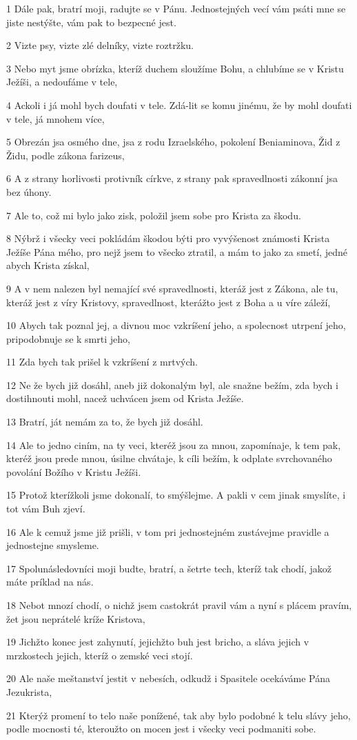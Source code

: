 \par 1 Dále pak, bratrí moji, radujte se v Pánu. Jednostejných vecí vám psáti mne se jiste nestýšte, vám pak to bezpecné jest.
\par 2 Vizte psy, vizte zlé delníky, vizte roztržku.
\par 3 Nebo myt jsme obrízka, kteríž duchem sloužíme Bohu, a chlubíme se v Kristu Ježíši, a nedoufáme v tele,
\par 4 Ackoli i já mohl bych doufati v tele. Zdá-lit se komu jinému, že by mohl doufati v tele, já mnohem více,
\par 5 Obrezán jsa osmého dne, jsa z rodu Izraelského, pokolení Beniaminova, Žid z Židu, podle zákona farizeus,
\par 6 A z strany horlivosti protivník církve, z strany pak spravedlnosti zákonní jsa bez úhony.
\par 7 Ale to, což mi bylo jako zisk, položil jsem sobe pro Krista za škodu.
\par 8 Nýbrž i všecky veci pokládám škodou býti pro vyvýšenost známosti Krista Ježíše Pána mého, pro nejž jsem to všecko ztratil, a mám to jako za smetí, jedné abych Krista získal,
\par 9 A v nem nalezen byl nemající své spravedlnosti, kteráž jest z Zákona, ale tu, kteráž jest z víry Kristovy, spravedlnost, kterážto jest z Boha a u víre záleží,
\par 10 Abych tak poznal jej, a divnou moc vzkríšení jeho, a spolecnost utrpení jeho, pripodobnuje se k smrti jeho,
\par 11 Zda bych tak prišel k vzkríšení z mrtvých.
\par 12 Ne že bych již dosáhl, aneb již dokonalým byl, ale snažne bežím, zda bych i dostihnouti mohl, nacež uchvácen jsem od Krista Ježíše.
\par 13 Bratrí, ját nemám za to, že bych již dosáhl.
\par 14 Ale to jedno ciním, na ty veci, kteréž jsou za mnou, zapomínaje, k tem pak, kteréž jsou prede mnou, úsilne chvátaje, k cíli bežím, k odplate svrchovaného povolání Božího v Kristu Ježíši.
\par 15 Protož kterížkoli jsme dokonalí, to smýšlejme. A pakli v cem jinak smyslíte, i tot vám Buh zjeví.
\par 16 Ale k cemuž jsme již prišli, v tom pri jednostejném zustávejme pravidle a jednostejne smysleme.
\par 17 Spolunásledovníci moji budte, bratrí, a šetrte tech, kteríž tak chodí, jakož máte príklad na nás.
\par 18 Nebot mnozí chodí, o nichž jsem castokrát pravil vám a nyní s plácem pravím, žet jsou neprátelé kríže Kristova,
\par 19 Jichžto konec jest zahynutí, jejichžto buh jest bricho, a sláva jejich v mrzkostech jejich, kteríž o zemské veci stojí.
\par 20 Ale naše meštanství jestit v nebesích, odkudž i Spasitele ocekáváme Pána Jezukrista,
\par 21 Kterýž promení to telo naše ponížené, tak aby bylo podobné k telu slávy jeho, podle mocnosti té, kteroužto on mocen jest i všecky veci podmaniti sobe.


